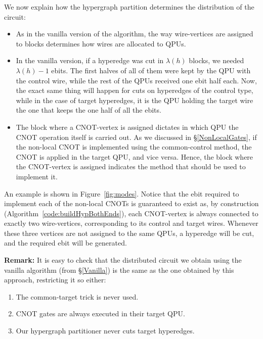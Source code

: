 We now explain how the hypergraph partition determines the distribution of the circuit:

\begin{itemize}
  \item As in the vanilla version of the algorithm, the way wire-vertices are assigned to blocks determines how wires are allocated to QPUs.
  \item In the vanilla version, if a hyperedge was cut in \(\lambda(h)\) blocks, we needed \(\lambda(h)-1\) ebits. The first halves of all of them were kept by the QPU with the control wire, while the rest of the QPUs received one ebit half each. Now, the exact same thing will happen for cuts on hyperedges of the control type, while in the case of target hyperedges, it is the QPU holding the target wire the one that keeps the one half of all the ebits. 
  \item The block where a CNOT-vertex is assigned dictates in which QPU the CNOT operation itself is carried out. As we discussed in \S\ref{NonLocalGates}, if the non-local CNOT is implemented using the common-control method, the CNOT is applied in the target QPU, and vice versa. Hence, the block where the CNOT-vertex is assigned indicates the method that should be used to implement it. 
\end{itemize}

An example is shown in Figure~\ref{fig:modes}. Notice that the ebit required to implement each of the non-local CNOTs is guaranteed to exist as, by construction (Algorithm~\ref{code:buildHypBothEnds}), each CNOT-vertex is always connected to exactly two wire-vertices, corresponding to its control and target wires. Whenever these three vertices are not assigned to the same QPUs, a hyperedge will be cut, and the required ebit will be generated.

\begin{mdframed}[backgroundcolor=gray!20,leftmargin=20pt,rightmargin=20pt, innerbottommargin=10pt] 
\small
\textbf{Remark:} It is easy to check that the distributed circuit we obtain using the vanilla algorithm (from \S\ref{Vanilla}) is the same as the one obtained by this approach, restricting it so either:
\begin{enumerate}
  \renewcommand{\theenumi}{\alph{enumi})}
  \item The common-target trick is never used.
  \item CNOT gates are always executed in their target QPU.
  \item Our hypergraph partitioner never cuts target hyperedges.
\end{enumerate}
\end{mdframed}

